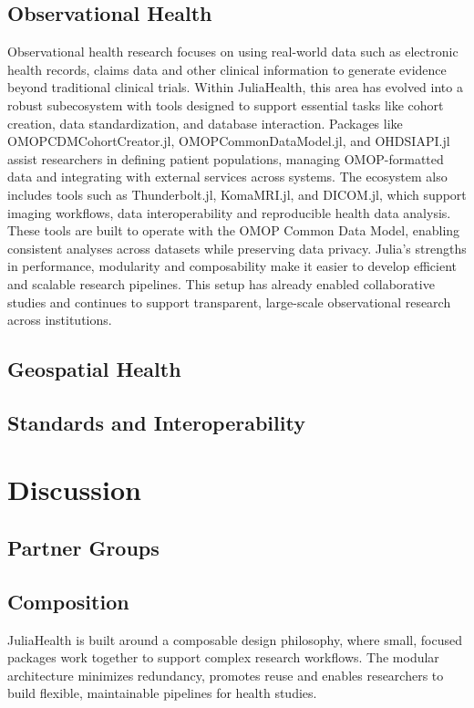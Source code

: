 \documentclass{article}
\begin{document}
\subsection{Observational Health}

Observational health research focuses on using real-world data such as electronic health records, claims data and other clinical information to generate evidence beyond traditional clinical trials. Within JuliaHealth, this area has evolved into a robust subecosystem with tools designed to support essential tasks like cohort creation, data standardization, and database interaction. Packages like OMOPCDMCohortCreator.jl, OMOPCommonDataModel.jl, and OHDSIAPI.jl assist researchers in defining patient populations, managing OMOP-formatted data and integrating with external services across systems. The ecosystem also includes tools such as Thunderbolt.jl, KomaMRI.jl, and DICOM.jl, which support imaging workflows, data interoperability and reproducible health data analysis. These tools are built to operate with the OMOP Common Data Model, enabling consistent analyses across datasets while preserving data privacy. Julia’s strengths in performance, modularity and composability make it easier to develop efficient and scalable research pipelines. This setup has already enabled collaborative studies and continues to support transparent, large-scale observational research across institutions.

\subsection{Geospatial Health}

\subsection{Standards and Interoperability}

\section{Discussion}

\subsection{Partner Groups}

\subsection{Composition}
JuliaHealth is built around a composable design philosophy, where small, focused packages work together to support complex research workflows. The modular architecture minimizes redundancy, promotes reuse and enables researchers to build flexible, maintainable pipelines for health studies.
\end{document}
